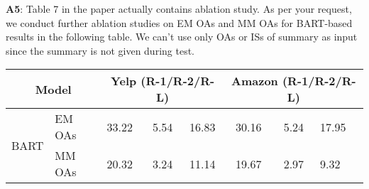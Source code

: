 \documentclass[letterpaper]{article} %
\newcommand{\tabref}[1]{Table \ref{#1}}
\newcommand{\cut}[1]{}
\begin{document}
\noindent 
\textbf{A5}: 
Table 7 in the paper actually contains ablation study.
As per your request, we conduct further ablation studies on EM OAs and MM OAs for BART-based results in the following table. 
We can't use only OAs or ISs of summary as input since the summary is not given during test. 
\begin{table}[ht]
	\scriptsize
	\centering
	\begin{tabular}{|l|l|m{0.6cm}<{\centering}|c|c|c|c|m{0.6cm}<{\centering}|}
		\hline
		\multicolumn{2}{|c|}{\bf Model} & \multicolumn{3}{c|}{\bf Yelp (R-1/R-2/R-L)} 
& \multicolumn{3}{c|}{\bf Amazon (R-1/R-2/R-L)} \\ %
		\hline
		\multirow{2}{*}{BART}&EM OAs & 33.22 & 5.54 & 16.83 & 30.16 & 5.24& 17.95\\
		&MM OAs & 20.32 & 3.24 & 11.14 & 19.67& 2.97 & 9.32 \\
		\hline
	\end{tabular}
	\label{tab:abla}
\end{table}
\end{document}
